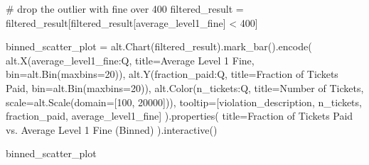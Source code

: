 \documentclass[
  letterpaper,
  DIV=11,
  numbers=noendperiod]{scrartcl}
\newenvironment{Shaded}{\begin{snugshade}}{\end{snugshade}}
\newcommand{\BuiltInTok}[1]{\textcolor[rgb]{0.00,0.23,0.31}{#1}}
\newcommand{\CommentTok}[1]{\textcolor[rgb]{0.37,0.37,0.37}{#1}}
\newcommand{\DecValTok}[1]{\textcolor[rgb]{0.68,0.00,0.00}{#1}}
\newcommand{\NormalTok}[1]{\textcolor[rgb]{0.00,0.23,0.31}{#1}}
\newcommand{\OperatorTok}[1]{\textcolor[rgb]{0.37,0.37,0.37}{#1}}
\newcommand{\StringTok}[1]{\textcolor[rgb]{0.13,0.47,0.30}{#1}}
\begin{document}
\begin{Shaded}
\begin{Highlighting}[]
\CommentTok{\# drop the outlier with fine over 400}
\NormalTok{filtered\_result }\OperatorTok{=}\NormalTok{ filtered\_result[filtered\_result[}\StringTok{\textquotesingle{}average\_level1\_fine\textquotesingle{}}\NormalTok{] }\OperatorTok{\textless{}} \DecValTok{400}\NormalTok{]    }

\NormalTok{binned\_scatter\_plot }\OperatorTok{=}\NormalTok{ alt.Chart(filtered\_result).mark\_bar().encode(}
\NormalTok{    alt.X(}\StringTok{\textquotesingle{}average\_level1\_fine:Q\textquotesingle{}}\NormalTok{, title}\OperatorTok{=}\StringTok{\textquotesingle{}Average Level 1 Fine\textquotesingle{}}\NormalTok{, }\BuiltInTok{bin}\OperatorTok{=}\NormalTok{alt.Bin(maxbins}\OperatorTok{=}\DecValTok{20}\NormalTok{)),}
\NormalTok{    alt.Y(}\StringTok{\textquotesingle{}fraction\_paid:Q\textquotesingle{}}\NormalTok{, title}\OperatorTok{=}\StringTok{\textquotesingle{}Fraction of Tickets Paid\textquotesingle{}}\NormalTok{, }\BuiltInTok{bin}\OperatorTok{=}\NormalTok{alt.Bin(maxbins}\OperatorTok{=}\DecValTok{20}\NormalTok{)),}
\NormalTok{    alt.Color(}\StringTok{\textquotesingle{}n\_tickets:Q\textquotesingle{}}\NormalTok{, title}\OperatorTok{=}\StringTok{\textquotesingle{}Number of Tickets\textquotesingle{}}\NormalTok{,}
\NormalTok{        scale}\OperatorTok{=}\NormalTok{alt.Scale(domain}\OperatorTok{=}\NormalTok{[}\DecValTok{100}\NormalTok{, }\DecValTok{20000}\NormalTok{])),}
\NormalTok{    tooltip}\OperatorTok{=}\NormalTok{[}\StringTok{\textquotesingle{}violation\_description\textquotesingle{}}\NormalTok{, }\StringTok{\textquotesingle{}n\_tickets\textquotesingle{}}\NormalTok{, }\StringTok{\textquotesingle{}fraction\_paid\textquotesingle{}}\NormalTok{, }\StringTok{\textquotesingle{}average\_level1\_fine\textquotesingle{}}\NormalTok{]}
\NormalTok{).properties(}
\NormalTok{    title}\OperatorTok{=}\StringTok{\textquotesingle{}Fraction of Tickets Paid vs. Average Level 1 Fine (Binned)\textquotesingle{}}
\NormalTok{).interactive()}

\NormalTok{binned\_scatter\_plot}
\end{Highlighting}
\end{Shaded}
\end{document}
